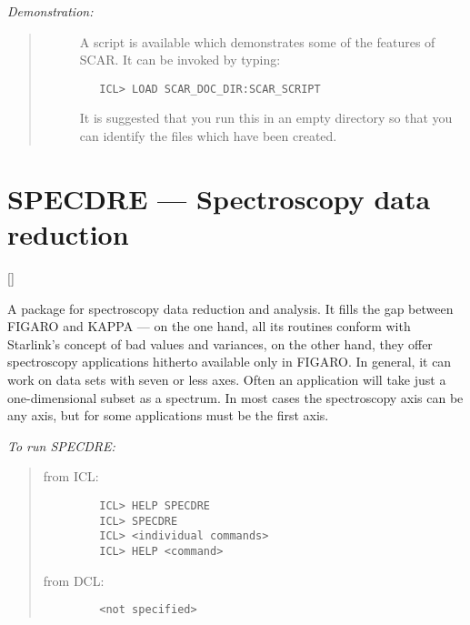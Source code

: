 {\em Demonstration:}\hfill
\begin{quote}
\begin{description}
\item [] A script is available which demonstrates some of the features of SCAR.
It can be invoked by typing:

\begin{small}
\begin{verbatim}
   ICL> LOAD SCAR_DOC_DIR:SCAR_SCRIPT
\end{verbatim}
\end{small}

It is suggested that you run this in an empty directory so that you can 
identify the files which have been created.
\end{description}
\end{quote}

\newpage

\section{SPECDRE --- Spectroscopy data reduction} 

\vspace{-11mm}

\hfill []

\vspace{5mm}

A package for spectroscopy data reduction and analysis.
It fills the gap between FIGARO and KAPPA --- on the one hand, all its routines
conform with Starlink's concept of bad values and variances, on the other hand,
they offer spectroscopy applications hitherto available only in FIGARO.
In general, it can work on data sets with seven or less axes.
Often an application will take just a one-dimensional subset as a spectrum.
In most cases the spectroscopy axis can be any axis, but for some applications
must be the first axis.

{\em To run SPECDRE:}\hfill
\begin{quote}
\begin{description}

\item [from ICL:]\hfill

\begin{small}
\begin{verbatim}
   ICL> HELP SPECDRE
   ICL> SPECDRE
   ICL> <individual commands>
   ICL> HELP <command>
\end{verbatim}
\end{small}

\item [from DCL:]\hfill

\begin{small}
\begin{verbatim}
   <not specified>
\end{verbatim}
\end{small}

\end{description}
\end{quote}

